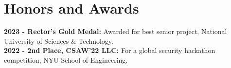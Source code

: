 \section{Honors and Awards}
\noindent
\textbf{2023 - Rector's Gold Medal:} Awarded for best senior project, National University of Sciences \& Technology. \\
\textbf{2022 - 2nd Place, CSAW'22 LLC:} For a global security hackathon competition, NYU School of Engineering.

